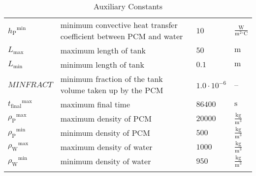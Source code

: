\documentclass[12pt]{article}
\begin{document}
\begin{longtabu}{l X[l] l l}
\\
${{h_{\text{P}}}^{\text{min}}}$ & minimum convective heat transfer coefficient between PCM and water & $10$ & $\frac{\text{W}}{\text{m}^{2}{}^{\circ}\text{C}}$
\\
${L_{\text{max}}}$ & maximum length of tank & $50$ & ${\text{m}}$
\\
${L_{\text{min}}}$ & minimum length of tank & $0.1$ & ${\text{m}}$
\\
$MINFRACT$ & minimum fraction of the tank volume taken up by the PCM & $1.0\cdot{}10^{-6}$ & --
\\
${{t_{\text{final}}}^{\text{max}}}$ & maximum final time & $86400$ & ${\text{s}}$
\\
${{ρ_{\text{P}}}^{\text{max}}}$ & maximum density of PCM & $20000$ & $\frac{\text{kg}}{\text{m}^{3}}$
\\
${{ρ_{\text{P}}}^{\text{min}}}$ & minimum density of PCM & $500$ & $\frac{\text{kg}}{\text{m}^{3}}$
\\
${{ρ_{\text{W}}}^{\text{max}}}$ & maximum density of water & $1000$ & $\frac{\text{kg}}{\text{m}^{3}}$
\\
${{ρ_{\text{W}}}^{\text{min}}}$ & minimum density of water & $950$ & $\frac{\text{kg}}{\text{m}^{3}}$
\\
\bottomrule
\caption{Auxiliary Constants}
\label{Table:TAuxConsts}
\end{longtabu}
\end{document}
